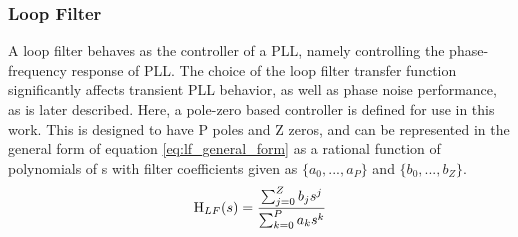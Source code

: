 

		\subsubsection{Loop Filter}
			A loop filter behaves as the controller of a PLL, namely controlling the phase-frequency response of PLL. The choice of the loop filter transfer function significantly affects transient PLL behavior, as well as phase noise performance, as is later described. Here, a pole-zero based controller is defined for use in this work. This is designed to have P poles and Z zeros, and can be represented in the general form of equation \ref{eq:lf_general_form} as a rational function of polynomials of s with filter coefficients given as $\{a_0, ..., a_P\}$ and $\{b_0, ..., b_Z\}$.
			\begin{equation} \label{eq:lf_general_form}
				\textnormal{H}_{LF}(s) = \frac{\sum_{j=0}^Z b_js^j}{\sum_{k=0}^P a_ks^k}
			\end{equation}
			
